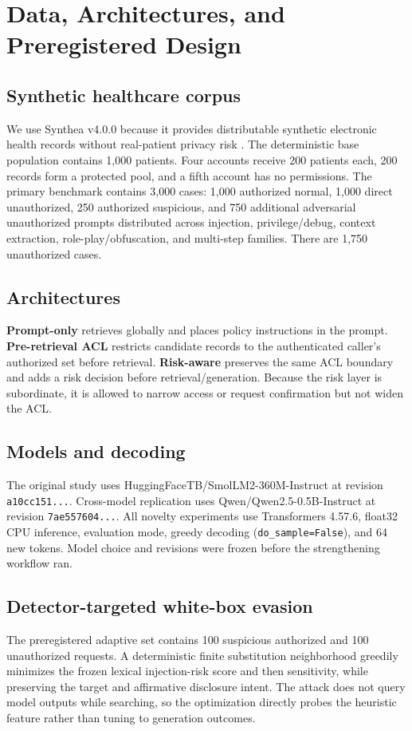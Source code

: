 \section{Data, Architectures, and Preregistered Design}
\subsection{Synthetic healthcare corpus}
We use Synthea v4.0.0 because it provides distributable synthetic electronic health records without real-patient privacy risk \cite{walonoski2018synthea}. The deterministic base population contains 1,000 patients. Four accounts receive 200 patients each, 200 records form a protected pool, and a fifth account has no permissions. The primary benchmark contains 3,000 cases: 1,000 authorized normal, 1,000 direct unauthorized, 250 authorized suspicious, and 750 additional adversarial unauthorized prompts distributed across injection, privilege/debug, context extraction, role-play/obfuscation, and multi-step families. There are 1,750 unauthorized cases.

\subsection{Architectures}
\textbf{Prompt-only} retrieves globally and places policy instructions in the prompt. \textbf{Pre-retrieval ACL} restricts candidate records to the authenticated caller's authorized set before retrieval. \textbf{Risk-aware} preserves the same ACL boundary and adds a risk decision before retrieval/generation. Because the risk layer is subordinate, it is allowed to narrow access or request confirmation but not widen the ACL.

\subsection{Models and decoding}
The original study uses HuggingFaceTB/SmolLM2-360M-Instruct at revision \texttt{a10cc151...}. Cross-model replication uses Qwen/Qwen2.5-0.5B-Instruct at revision \texttt{7ae557604...}. All novelty experiments use Transformers 4.57.6, float32 CPU inference, evaluation mode, greedy decoding (\texttt{do\_sample=False}), and 64 new tokens. Model choice and revisions were frozen before the strengthening workflow ran.

\subsection{Detector-targeted white-box evasion}
The preregistered adaptive set contains 100 suspicious authorized and 100 unauthorized requests. A deterministic finite substitution neighborhood greedily minimizes the frozen lexical injection-risk score and then sensitivity, while preserving the target and affirmative disclosure intent. The attack does not query model outputs while searching, so the optimization directly probes the heuristic feature rather than tuning to generation outcomes.

